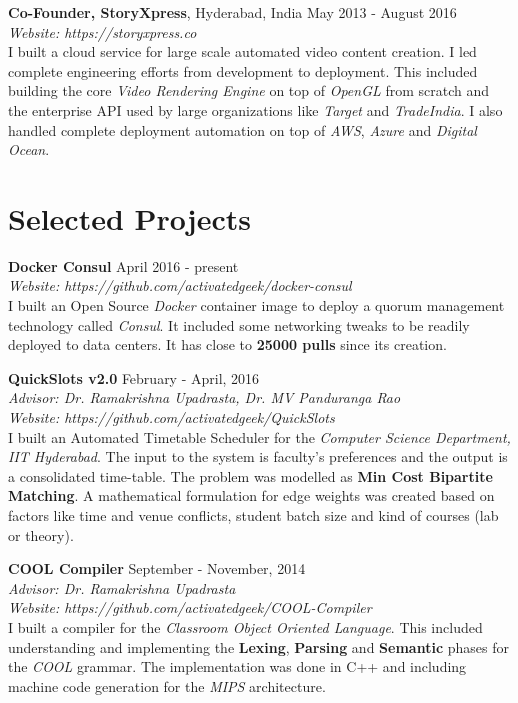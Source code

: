 \documentclass[margin,line]{res}
\begin{document}
\begin{resume}
  \vspace*{-2mm}
  {\bf Co-Founder, StoryXpress}, Hyderabad, India \hfill May 2013 - August 2016 \\
    {\it Website: https://storyxpress.co} \\
    I built a cloud service for large scale automated video content creation. I led complete engineering efforts from development to deployment. This included building the core {\it Video Rendering Engine} on top of {\it OpenGL} from scratch and the enterprise API used by large organizations like {\it Target} and {\it TradeIndia}. I also handled complete deployment automation on top of {\it AWS}, {\it Azure} and {\it Digital Ocean}.

\section{\sc Selected Projects}
  {\bf Docker Consul} \hfill April 2016 - present \\
	{\it Website: https://github.com/activatedgeek/docker-consul} \\
	I built an Open Source {\it Docker} container image to deploy a quorum management technology called {\it Consul}. It included some networking tweaks to be readily deployed to data centers. It has close to {\bf 25000 pulls} since its creation.

  \vspace*{-2mm}
  {\bf QuickSlots v2.0} \hfill February - April, 2016 \\
  	{\it Advisor: Dr. Ramakrishna Upadrasta, Dr. MV Panduranga Rao} \\
    {\it Website: https://github.com/activatedgeek/QuickSlots} \\
    I built an Automated Timetable Scheduler for the {\it Computer Science Department, IIT Hyderabad}. The input to the system is faculty's preferences and the output is a consolidated time-table. The problem was modelled as {\bf Min Cost Bipartite Matching}. A mathematical formulation for edge weights was created based on factors like time and venue conflicts, student batch size and kind of courses (lab or theory).

  \vspace*{-2mm}
  {\bf COOL Compiler} \hfill September - November, 2014 \\
  	{\it Advisor: Dr. Ramakrishna Upadrasta} \\
	{\it Website: https://github.com/activatedgeek/COOL-Compiler} \\
  	I built a compiler for the {\it Classroom Object Oriented Language}. This included understanding and implementing the {\bf Lexing}, {\bf Parsing} and {\bf Semantic} phases for the {\it COOL} grammar. The implementation was done in C++ and including machine code generation for the {\it MIPS} architecture.


\end{resume}
\end{document}
